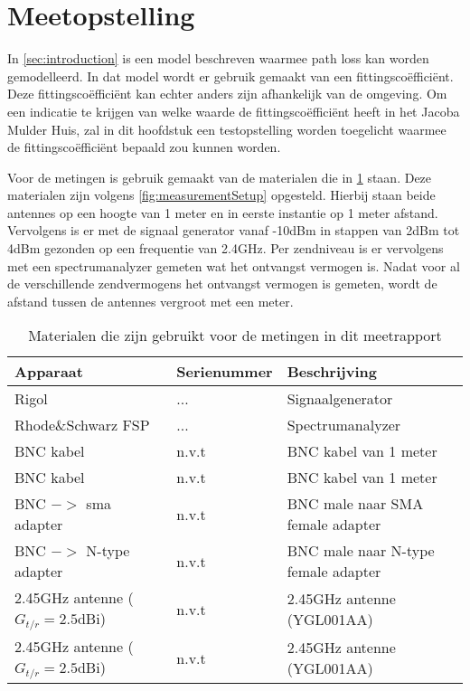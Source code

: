 \section{Meetopstelling} \label{sec:methods}
In \cref{sec:introduction} is een model beschreven waarmee path loss kan worden gemodelleerd. In dat model wordt er gebruik gemaakt van een fittingscoëfficiënt. Deze fittingscoëfficiënt kan echter anders zijn afhankelijk van de omgeving. Om een indicatie te krijgen van welke waarde de fittingscoëfficiënt heeft in het Jacoba Mulder Huis, zal in dit hoofdstuk een testopstelling worden toegelicht waarmee de fittingscoëfficiënt bepaald zou kunnen worden.

Voor de metingen is gebruik gemaakt van de materialen die in \cref{tab:measurement:materials} staan. Deze materialen zijn volgens \cref{fig:measurementSetup} opgesteld. Hierbij staan beide antennes op een hoogte van 1 meter en in eerste instantie op 1 meter afstand. Vervolgens is er met de signaal generator vanaf -10dBm in stappen van 2dBm tot 4dBm gezonden op een frequentie van 2.4GHz. Per zendniveau is er vervolgens met een spectrumanalyzer gemeten wat het ontvangst vermogen is. Nadat voor al de verschillende zendvermogens het ontvangst vermogen is gemeten, wordt de afstand tussen de antennes vergroot met een meter. 
\begin{table}[ht]
    \centering
    \begin{tabular}{l|l|l}
        Apparaat                            & Serienummer   & Beschrijving \\\hline
        Rigol                               & ...           & Signaalgenerator \\
        Rhode\&Schwarz FSP                  & ...           & Spectrumanalyzer \\
        BNC kabel                           & n.v.t         & BNC kabel van 1 meter \\
        BNC kabel                           & n.v.t         & BNC kabel van 1 meter \\
        BNC $->$ sma adapter                & n.v.t         & BNC male naar SMA female adapter \\
        BNC $->$ N-type adapter             & n.v.t         & BNC male naar N-type female adapter \\
        2.45GHz antenne ($G_{t/r}=2.5$dBi)  & n.v.t         & 2.45GHz antenne (YGL001AA) \\
        2.45GHz antenne ($G_{t/r}=2.5$dBi)  & n.v.t         & 2.45GHz antenne (YGL001AA) \\\hline
    \end{tabular}
    \caption{Materialen die zijn gebruikt voor de metingen in dit meetrapport}
    \label{tab:measurement:materials}
\end{table}
